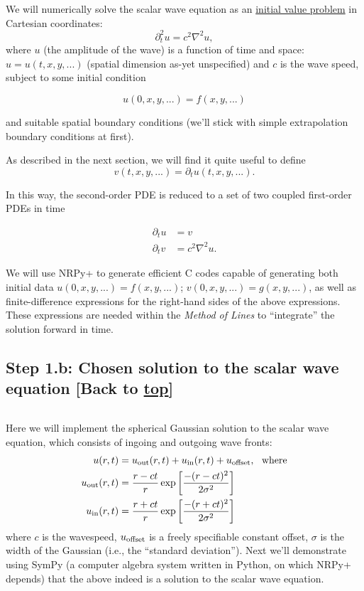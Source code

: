 \documentclass[landscape,letterpaper,10pt,english]{article}
\begin{document}
\[\label{problem_statement}\]

We will numerically solve the scalar wave equation as an
\href{https://en.wikipedia.org/wiki/Initial_value_problem}{initial value
problem} in Cartesian coordinates: \[\partial_t^2 u = c^2 \nabla^2 u,\]
where \(u\) (the amplitude of the wave) is a function of time and space:
\(u = u(t,x,y,...)\) (spatial dimension as-yet unspecified) and \(c\) is
the wave speed, subject to some initial condition

\[u(0,x,y,...) = f(x,y,...)\]

and suitable spatial boundary conditions (we'll stick with simple
extrapolation boundary conditions at first).

As described in the next section, we will find it quite useful to define
\[v(t,x,y,...) = \partial_t u(t,x,y,...).\]

In this way, the second-order PDE is reduced to a set of two coupled
first-order PDEs in time

\begin{align}
\partial_t u &= v \\
\partial_t v &= c^2 \nabla^2 u.
\end{align}

We will use NRPy+ to generate efficient C codes capable of generating
both initial data \(u(0,x,y,...) = f(x,y,...)\);
\(v(0,x,y,...)=g(x,y,...)\), as well as finite-difference expressions
for the right-hand sides of the above expressions. These expressions are
needed within the \emph{Method of Lines} to ``integrate'' the solution
forward in time.

    \hypertarget{step-1.b-chosen-solution-to-the-scalar-wave-equation-back-to-top}{%
\subsection{\texorpdfstring{Step 1.b: Chosen solution to the scalar wave
equation {[}Back to
\hyperref[toc]{top}{]}}{Step 1.b: Chosen solution to the scalar wave equation {[}Back to {]}}}\label{step-1.b-chosen-solution-to-the-scalar-wave-equation-back-to-top}}

\[\label{solution}\]

Here we will implement the spherical Gaussian solution to the scalar
wave equation, which consists of ingoing and outgoing wave fronts:
\begin{align}
u(r,t) &= u_{\rm out}(r,t) + u_{\rm in}(r,t) + u_{\rm offset},\ \ \text{where}\\
u_{\rm out}(r,t) &=\frac{r-ct}{r} \exp\left[\frac{-(r-ct)^2}{2 \sigma^2}\right] \\
u_{\rm in}(r,t) &=\frac{r+ct}{r} \exp\left[\frac{-(r+ct)^2}{2 \sigma^2}\right] \\
\end{align} where \(c\) is the wavespeed, \(u_{\rm offset}\) is a freely
specifiable constant offset, \(\sigma\) is the width of the Gaussian
(i.e., the ``standard deviation''). Next we'll demonstrate using SymPy
(a computer algebra system written in Python, on which NRPy+ depends)
that the above indeed is a solution to the scalar wave equation.
\end{document}
